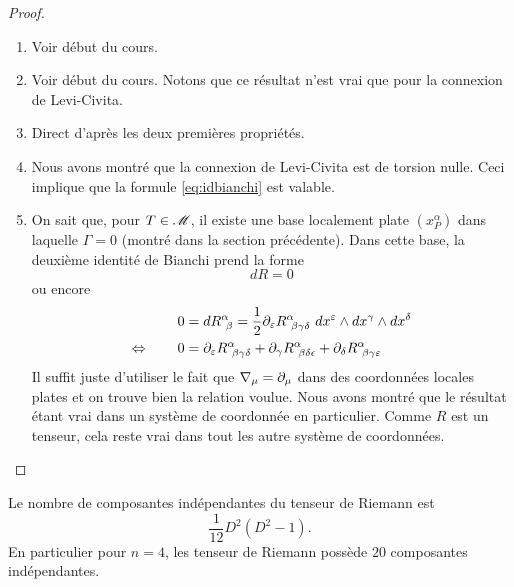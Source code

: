 \documentclass[a4paper,11pt]{report}
\begin{document}
                \begin{proof}${}$\\
                    \begin{enumerate}[label = \textit{\roman*)}]
                        \item Voir début du cours.
                        \item Voir début du cours. Notons que ce résultat n'est vrai que pour la connexion de Levi-Civita.
                        \item Direct d'après les deux premières propriétés.
                        \item Nous avons montré que la connexion de Levi-Civita est de torsion nulle. Ceci implique que la formule \ref{eq:idbianchi} est valable.
                        \item On sait que, pour $T\in\mathscr{M}$, il existe une base localement plate $(x^\alpha_P)$ dans laquelle $\Gamma = 0$ (montré dans la section précédente). Dans cette base, la deuxième identité de Bianchi prend la forme
                        \begin{equation}
                            dR = 0
                        \end{equation}
                        ou encore
                        \begin{align}
                            0 &= dR^\alpha_{~\beta} = \frac{1}{2} \partial_\varepsilon R^\alpha_{~\beta\gamma\delta}~dx^\varepsilon\wedge dx^\gamma\wedge dx^\delta \\
                            \Leftrightarrow\qquad 0 &= \partial_\varepsilon R^\alpha_{~\beta\gamma\delta} + \partial_\gamma R^\alpha_{~\beta\delta\epsilon} + \partial_\delta R^\alpha_{~\beta\gamma\varepsilon}
                        \end{align}
                        Il suffit juste d'utiliser le fait que $\nabla_\mu = \partial_\mu$ dans des coordonnées locales plates et on trouve bien la relation voulue. Nous avons montré que le résultat étant vrai dans un système de coordonnée en particulier. Comme $R$ est un tenseur, cela reste vrai dans tout les autre système de coordonnées.
                    \end{enumerate}
                \end{proof}
                
                \begin{prop}\begin{leftbar}
                    Le nombre de composantes indépendantes du tenseur de Riemann est
                    \begin{equation}
                        \frac{1}{12}D^2(D^2-1).
                    \end{equation}
                    En particulier pour $n=4$, les tenseur de Riemann possède $20$ composantes indépendantes.
                \end{leftbar}\end{prop}
                
\end{document}
